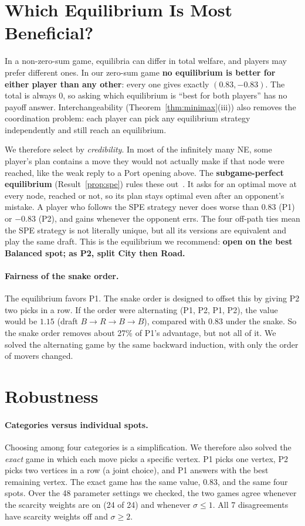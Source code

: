 \documentclass[11pt]{article}
\begin{document}
\section{Which Equilibrium Is Most Beneficial?}\label{sec:best}
In a non-zero-sum game, equilibria can differ in total welfare, and players may prefer different ones. In our zero-sum game \textbf{no equilibrium is better for either player than any other}: every one gives exactly $(0.83,-0.83)$. The total is always 0, so asking which equilibrium is ``best for both players'' has no payoff answer. Interchangeability (Theorem~\ref{thm:minimax}(iii)) also removes the coordination problem: each player can pick any equilibrium strategy independently and still reach an equilibrium.

We therefore select by \emph{credibility}. In most of the infinitely many NE, some player's plan contains a move they would not actually make if that node were reached, like the weak reply to a Port opening above. The \textbf{subgame-perfect equilibrium} (Result~\ref{prop:spe}) rules these out~\cite{selten}. It asks for an optimal move at every node, reached or not, so its plan stays optimal even after an opponent's mistake. A player who follows the SPE strategy never does worse than $0.83$ (P1) or $-0.83$ (P2), and gains whenever the opponent errs. The four off-path ties mean the SPE strategy is not literally unique, but all its versions are equivalent and play the same draft. This is the equilibrium we recommend: \textbf{open on the best Balanced spot; as P2, split City then Road.}

\paragraph{Fairness of the snake order.} The equilibrium favors P1. The snake order is designed to offset this by giving P2 two picks in a row. If the order were alternating (P1, P2, P1, P2), the value would be $1.15$ (draft $B\to R\to B\to B$), compared with $0.83$ under the snake. So the snake order removes about 27\% of P1's advantage, but not all of it. We solved the alternating game by the same backward induction, with only the order of movers changed.

\section{Robustness}\label{sec:robust}
\paragraph{Categories versus individual spots.} Choosing among four categories is a simplification. We therefore also solved the \emph{exact} game in which each move picks a specific vertex. P1 picks one vertex, P2 picks two vertices in a row (a joint choice), and P1 answers with the best remaining vertex. The exact game has the same value, $0.83$, and the same four spots. Over the 48 parameter settings we checked, the two games agree whenever the scarcity weights are on (24 of 24) and whenever $\sigma\le1$. All 7 disagreements have scarcity weights off and $\sigma\ge2$.
\end{document}
